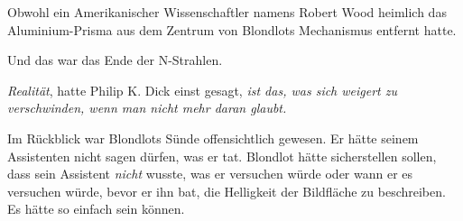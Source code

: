 Obwohl ein Amerikanischer Wissenschaftler namens Robert Wood heimlich das Aluminium-Prisma aus dem Zentrum von Blondlots Mechanismus entfernt hatte.

Und das war das Ende der N-Strahlen.

\emph{Realität}, hatte Philip K. Dick einst gesagt, \emph{ist das, was sich weigert zu verschwinden, wenn man nicht mehr daran glaubt.}

Im Rückblick war Blondlots Sünde offensichtlich gewesen. Er hätte seinem Assistenten nicht sagen dürfen, was er tat. Blondlot hätte sicherstellen sollen, dass sein Assistent \emph{nicht} wusste, was er versuchen würde oder wann er es versuchen würde, bevor er ihn bat, die Helligkeit der Bildfläche zu beschreiben. Es hätte so einfach sein können.

